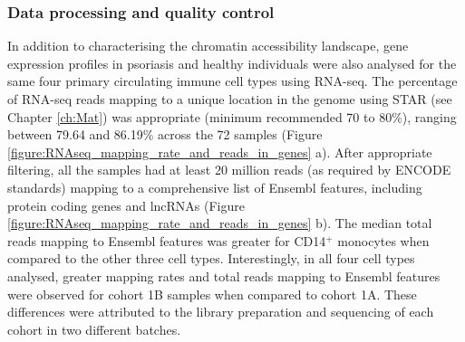 \subsubsection{Data processing and quality control}

In addition to characterising the chromatin accessibility landscape, gene expression profiles in psoriasis and healthy individuals were also analysed for the same four primary circulating immune cell types using RNA-seq. The percentage of RNA-seq reads mapping to a unique location in the genome using STAR (see Chapter \ref{ch:Mat}) was appropriate (minimum recommended 70 to 80\%), ranging between 79.64 and 86.19\% across the 72 samples (Figure \ref{figure:RNAseq_mapping_rate_and_reads_in_genes} a). After appropriate filtering, all the samples had at least 20 million reads (as required by ENCODE standards) mapping to a comprehensive list of Ensembl features, including protein coding genes and lncRNAs (Figure \ref{figure:RNAseq_mapping_rate_and_reads_in_genes} b). The median total reads mapping to Ensembl features was greater for CD14$^+$ monocytes when compared to the other three cell types. Interestingly, in all four cell types analysed, greater mapping rates and total reads mapping to Ensembl features were observed for cohort 1B samples when compared to cohort 1A. These differences were attributed to the library preparation and sequencing of each cohort in two different batches.  

